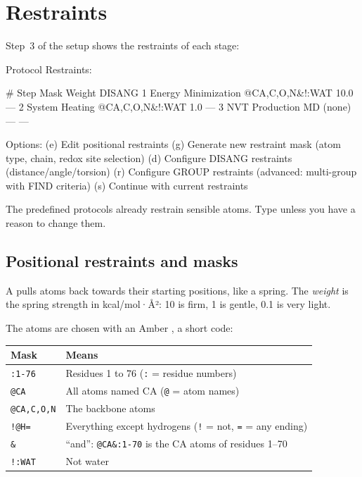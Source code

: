 \section{Restraints}\label{sec:runningmd-restraints}

Step~3 of the setup shows the restraints of each stage:

\begin{screen}
Protocol Restraints:

    #    Step                   Mask                 Weight    DISANG
    1    Energy Minimization    @CA,C,O,N&!:WAT        10.0    —
    2    System Heating         @CA,C,O,N&!:WAT         1.0    —
    3    NVT Production MD      (none)                    —    —

Options:
   (e) Edit positional restraints
   (g) Generate new restraint mask (atom type, chain, redox site selection)
   (d) Configure DISANG restraints (distance/angle/torsion)
   (r) Configure GROUP restraints (advanced: multi-group with FIND criteria)
   (s) Continue with current restraints
\end{screen}

The predefined protocols already restrain sensible atoms. Type  unless
you have a reason to change them.

\subsection{Positional restraints and masks}

A  pulls atoms back towards their starting
positions, like a spring. The \emph{weight} is the spring strength in
kcal/mol·Å²: 10 is firm, 1 is gentle, 0.1 is very light.

The atoms are chosen with an Amber , a short code:

\begin{tabularx}{\linewidth}{@{}lL@{}}
\toprule
\textbf{Mask} & \textbf{Means} \\
\midrule
\texttt{:1-76} & Residues 1 to 76 (\texttt{:} = residue numbers) \\
\texttt{@CA} & All atoms named CA (\texttt{@} = atom names) \\
\texttt{@CA,C,O,N} & The backbone atoms \\
\texttt{!@H=} & Everything except hydrogens (\texttt{!} = not, \texttt{=} = any ending) \\
\texttt{\&} & ``and'': \texttt{@CA\&:1-70} is the CA atoms of residues 1--70 \\
\texttt{!:WAT} & Not water \\
\bottomrule
\end{tabularx}

